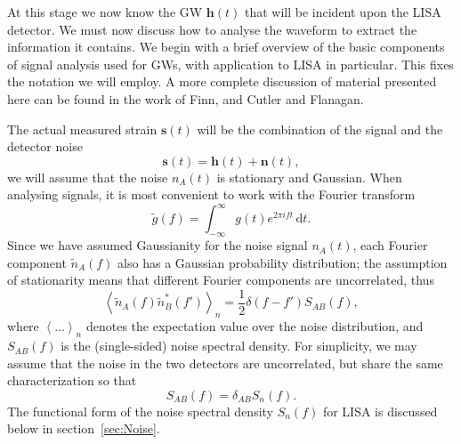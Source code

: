 \documentclass[a4paper, 11pt, titlepage, twoside]{report}
\newcommand{\secref}[1]{section~\ref{sec:#1}}
\newcommand{\recip}[1]{\ensuremath{\frac{1}{#1}}}
\newcommand{\dd}{\ensuremath{\mathrm{d}}}
\newcommand{\intd}[4]{\ensuremath{\int_{#1}^{#2}{#3}\,\dd{#4}}}
\begin{document}
{At this stage we now know the GW $\boldsymbol{h}(t)$ that will be incident upon the LISA detector. We must now discuss how to analyse the waveform to extract the information it contains. We begin with a brief overview of the basic components of signal analysis used for GWs, with application to LISA in particular. This fixes the notation we will employ. A more complete discussion of material presented here can be found in the work of Finn\cite{Finn1992}, and Cutler and Flanagan\cite{Cutler1994}.

The actual measured strain $\boldsymbol{s}(t)$ will be the combination of the signal and the detector noise
\begin{equation}
\boldsymbol{s}(t) = \boldsymbol{h}(t) + \boldsymbol{n}(t),
\end{equation}
we will assume that the noise $n_A(t)$ is stationary and Gaussian. When analysing signals, it is most convenient to work with the Fourier transform
\begin{equation}
\tilde{g}(f) = \intd{-\infty}{\infty}{g(t)e^{2\pi i ft}}{t}.
\end{equation}
Since we have assumed Gaussianity for the noise signal $n_A(t)$, each Fourier component $\tilde{n}_A(f)$ also has a Gaussian probability distribution; the assumption of stationarity means that different Fourier components are uncorrelated, thus\cite{Cutler1994}
\begin{equation}
\left\langle\tilde{n}_A(f)\tilde{n}_B^*(f')\right\rangle_n = \recip{2}\delta(f - f')S_{AB}(f),
\end{equation}
where $\left\langle\ldots\right\rangle_n$ denotes the expectation value over the noise distribution, and $S_{AB}(f)$ is the (single-sided) noise spectral density. For simplicity, we may assume that the noise in the two detectors are uncorrelated, but share the same characterization so that\cite{Cutler1998}
\begin{equation}
S_{AB}(f) = \delta_{AB}S_n(f).
\end{equation}
The functional form of the noise spectral density $S_n(f)$ for LISA is discussed below in \secref{Noise}.

}
\end{document}

